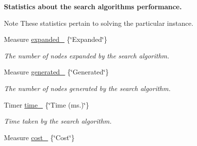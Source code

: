\begin{Indent}{\bf Statistics about the search algorithm\textquotesingle{}s performance.}\par
{\em \begin{DoxyNote}{Note}
These statistics pertain to solving the particular instance. 
\end{DoxyNote}
}\begin{DoxyCompactItemize}
\item 
Measure \hyperlink{structslb_1_1ext_1_1algorithm_1_1Algorithm_a5d6d2b982578359c96d1276ac217e2ce}{expanded\+\_\+} \{\char`\"{}Expanded\char`\"{}\}\hypertarget{structslb_1_1ext_1_1algorithm_1_1Algorithm_a5d6d2b982578359c96d1276ac217e2ce}{}\label{structslb_1_1ext_1_1algorithm_1_1Algorithm_a5d6d2b982578359c96d1276ac217e2ce}

\begin{DoxyCompactList}\small\item\em The number of nodes expanded by the search algorithm. \end{DoxyCompactList}\item 
Measure \hyperlink{structslb_1_1ext_1_1algorithm_1_1Algorithm_ad8b051ee61ed7b4ac6337015f4f43ada}{generated\+\_\+} \{\char`\"{}Generated\char`\"{}\}\hypertarget{structslb_1_1ext_1_1algorithm_1_1Algorithm_ad8b051ee61ed7b4ac6337015f4f43ada}{}\label{structslb_1_1ext_1_1algorithm_1_1Algorithm_ad8b051ee61ed7b4ac6337015f4f43ada}

\begin{DoxyCompactList}\small\item\em The number of nodes generated by the search algorithm. \end{DoxyCompactList}\item 
Timer \hyperlink{structslb_1_1ext_1_1algorithm_1_1Algorithm_aa2b6a06d38134130e502ffc79ee6cb97}{time\+\_\+} \{\char`\"{}Time (ms.)\char`\"{}\}\hypertarget{structslb_1_1ext_1_1algorithm_1_1Algorithm_aa2b6a06d38134130e502ffc79ee6cb97}{}\label{structslb_1_1ext_1_1algorithm_1_1Algorithm_aa2b6a06d38134130e502ffc79ee6cb97}

\begin{DoxyCompactList}\small\item\em Time taken by the search algorithm. \end{DoxyCompactList}\item 
Measure \hyperlink{structslb_1_1ext_1_1algorithm_1_1Algorithm_a1d610112ac4f8f5a28c06a40a9c9c5ce}{cost\+\_\+} \{\char`\"{}Cost\char`\"{}\}\hypertarget{structslb_1_1ext_1_1algorithm_1_1Algorithm_a1d610112ac4f8f5a28c06a40a9c9c5ce}{}\label{structslb_1_1ext_1_1algorithm_1_1Algorithm_a1d610112ac4f8f5a28c06a40a9c9c5ce}


\end{DoxyCompactItemize}
\end{Indent}
